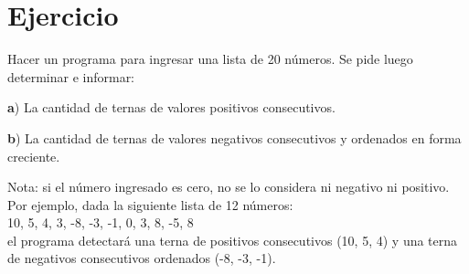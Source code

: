 \documentclass[12pt,a4paper,twoside]{article}
\begin{document}
\newpage{\ }
\newpage

\section{Ejercicio }

\hspace*{1cm}Hacer un programa para ingresar una lista de 20 números. Se pide luego determinar e informar: 
\begin{list}{•}{}
\item \textbf{a}) La cantidad de ternas de valores positivos consecutivos. 
\item \textbf{b}) La cantidad de ternas de valores negativos consecutivos y ordenados en forma creciente. 
\end{list}
Nota: si el número ingresado es cero, no se lo considera ni negativo ni positivo. Por ejemplo, dada la siguiente lista de 12 números:\\ 
\hspace*{1cm}10, 5, 4, 3, -8, -3, -1, 0, 3, 8, -5, 8\\
el programa detectará una terna de positivos consecutivos (10, 5, 4) y una terna de negativos consecutivos ordenados (-8, -3, -1). 

\newpage{\ }
\newpage
\end{document}
